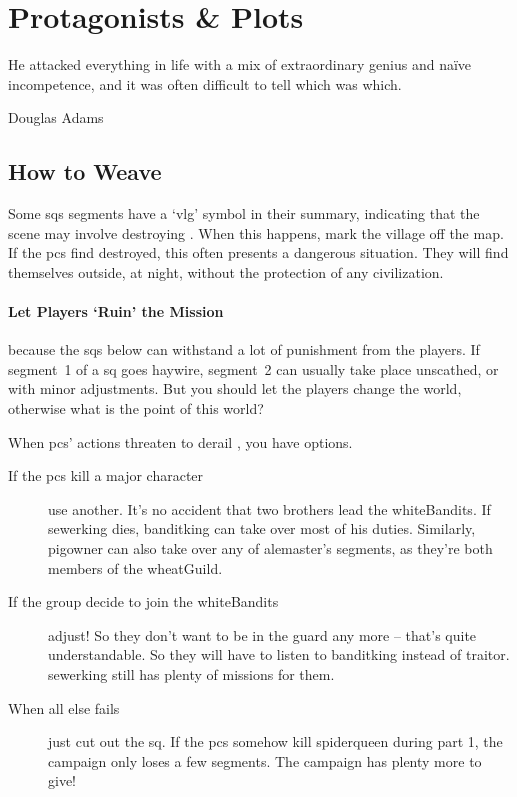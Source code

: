 \chapter{Protagonists \& Plots}
  \epigraph{He attacked everything in life with a mix of extraordinary genius and na\"ive incompetence, and it was often difficult to tell which was which.}{Douglas Adams}
\label{sideQuestIntro}

\section{How to Weave}
\label{sqSummaries}

\begin{multicols}{2}

Some \glspl{sq} \glspl{segment} have a `\gls{vlg}' symbol in their summary, indicating that the scene may involve destroying .
When this happens, mark the \gls{village} off the map.
If the \glspl{pc} find  destroyed, this often presents a dangerous situation.
They will find themselves outside, at night, without the protection of any civilization.

\subsubsection{Let Players `Ruin' the Mission}
because the \glspl{sq} below can withstand a lot of punishment from the players.
If \gls{segment}~1 of a \gls{sq} goes haywire, \gls{segment}~2 can usually take place unscathed, or with minor adjustments.
But you should let the players change the world, otherwise what is the point of this world?

When \glspl{pc}' actions threaten to derail , you have options.

\begin{description}
  \item[If the \glspl{pc} kill a major character]
  use another.
  It's no accident that two brothers lead the \gls{whiteBandits}.
  If \gls{sewerking} dies, \gls{banditking} can take over most of his duties.
  Similarly, \gls{pigowner} can also take over any of \gls{alemaster}'s \glspl{segment}, as they're both members of the \gls{wheatGuild}.
  \item[If the group decide to join the \gls{whiteBandits}]
  adjust!
  So they don't want to be in the \gls{guard} any more -- that's quite understandable.
  So they will have to listen to \gls{banditking} instead of \gls{traitor}.
  \Gls{sewerking} still has plenty of missions for them.
  \item[When all else fails]
  just cut out the \gls{sq}.
  If the \glspl{pc} somehow kill \gls{spiderqueen} during part 1, the campaign only loses a few \glspl{segment}.
  The campaign has plenty more to give!
\end{description}


\end{multicols}
